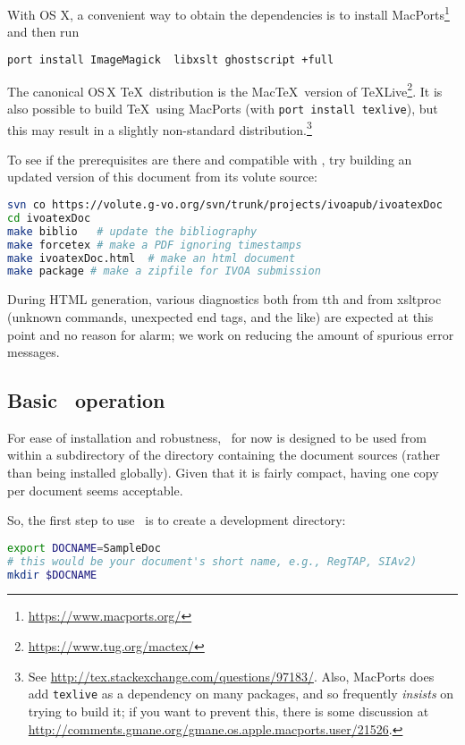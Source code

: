 \documentclass[11pt,a4paper]{ivoa}
\begin{document}
With OS X, a convenient way to obtain the dependencies is to install
MacPorts\footnote{\url{https://www.macports.org/}} and then run
\begin{lstlisting}[language=sh]
port install ImageMagick  libxslt ghostscript +full
\end{lstlisting}
The canonical OS\,X \TeX\ distribution is the Mac\TeX\ version of
\TeX Live\footnote{\url{https://www.tug.org/mactex/}}.  It is also
possible to build \TeX\ using MacPorts (with \texttt{port install
  texlive}), but this may result in a slightly non-standard
distribution.\footnote{See
  \url{http://tex.stackexchange.com/questions/97183/}.
  Also, MacPorts does add
  \texttt{texlive} as a dependency on many packages, and so frequently
  \emph{insists} on trying to build it; if you want to prevent this,
  there is some discussion at
  \url{http://comments.gmane.org/gmane.os.apple.macports.user/21526}.}

To see if the prerequisites are there and compatible with \ivoatex, try
building an updated version of this document from its volute source:
\begin{lstlisting}[language=sh]
svn co https://volute.g-vo.org/svn/trunk/projects/ivoapub/ivoatexDoc
cd ivoatexDoc
make biblio   # update the bibliography
make forcetex # make a PDF ignoring timestamps
make ivoatexDoc.html  # make an html document
make package # make a zipfile for IVOA submission
\end{lstlisting}
During HTML generation, various diagnostics both 
from tth and from xsltproc (unknown commands,
unexpected end tags, and the like) are
expected at this point and no reason for alarm; we work on reducing the
amount of spurious error messages.

\subsection{Basic \ivoatex~operation}

For ease of installation and robustness, \ivoatex\ for now is designed
to be used from within a subdirectory of the directory containing the
document sources (rather than being installed globally).  Given that
it is fairly compact, having one copy per document seems acceptable.

So, the first step to use \ivoatex\ is to create a development
directory:

\begin{lstlisting}[language=sh]
export DOCNAME=SampleDoc
# this would be your document's short name, e.g., RegTAP, SIAv2)
mkdir $DOCNAME
\end{lstlisting}
\end{document}
